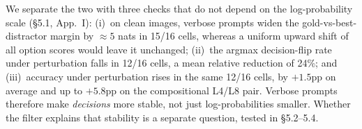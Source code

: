 We separate the two with three checks that do not depend on the
log-probability scale (\S5.1, App.~I):
(i)~on clean images, verbose prompts widen the gold-vs-best-distractor
margin by $\approx5$ nats in 15/16 cells, whereas a uniform upward
shift of all option scores would leave it unchanged;
(ii)~the argmax decision-flip rate under perturbation falls in 12/16
cells, a mean relative reduction of 24\%; and
(iii)~accuracy under perturbation rises in the same 12/16 cells, by
$+1.5$pp on average and up to $+5.8$pp on the compositional L4/L8 pair.
Verbose prompts therefore make \emph{decisions} more stable, not just
log-probabilities smaller. Whether the filter explains that stability
is a separate question, tested in \S5.2--5.4.
